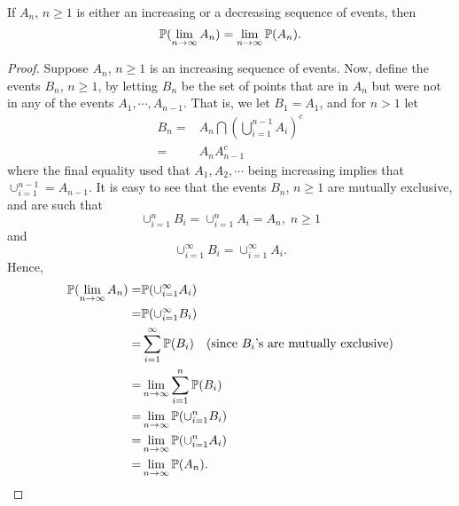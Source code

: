 \begin{proposition}
    If $A_n$, $n \ge 1$ is either an increasing or a decreasing sequence of events, then
    \begin{equation*}
        \mathbb{P}(\lim\limits_{n\to\infty} A_n) = \lim\limits_{n\to\infty} \mathbb{P} (A_n).
    \end{equation*}

    \begin{proof}
        Suppose $A_n$, $n \ge 1$ is an increasing sequence of events. Now, define the events $B_n$, $n \ge 1$, by letting $B_n$ be the set of points that are in $A_n$ but were not in any of the events $A_1, \cdots, A_{n-1}$. That is, we let $B_1 = A_1$, and for $n > 1$ let 
        \begin{align*}
            B_n = & A_n \bigcap \left(\bigcup_{i=1}^{n-1} A_i\right)^c \\ 
            = & A_n A_{n-1}^c
        \end{align*}
        where the final equality used that $A_1, A_2, \cdots$ being increasing implies that $\cup_{i=1}^{n-1} = A_{n-1}$. It is easy to see that the events $B_n$, $n \ge 1$ are mutually exclusive, and are such that 
        \begin{equation*}
            \cup_{i=1}^n B_i = \cup_{i=1}^n A_i = A_n, \; n \ge 1
        \end{equation*}
        and 
        \begin{equation*}
            \cup_{i=1}^\infty B_i = \cup_{i=1}^\infty A_i.
        \end{equation*}
        Hence, 
        \begin{align*}
            \mathbb{P} (\lim\limits_{n\to\infty} A_n) = & \mathbb{P} (\cup_{i=1}^\infty A_i) \\ 
            = & \mathbb{P} (\cup_{i=1}^\infty B_i) \\ 
            = & \sum_{i=1}^\infty \mathbb{P} (B_i) \quad (\text{since $B_i$'s are mutually exclusive}) \\ 
            = & \lim\limits_{n\to\infty} \sum_{i=1}^n \mathbb{P} (B_i) \\ 
            = & \lim\limits_{n\to\infty} \mathbb{P} (\cup_{i=1}^n B_i) \\ 
            = & \lim\limits_{n\to\infty} \mathbb{P} (\cup_{i=1}^n A_i) \\ 
            = & \lim\limits_{n\to\infty} \mathbb{P} (A_n).
        \end{align*}


\end{proof}
\end{proposition}
